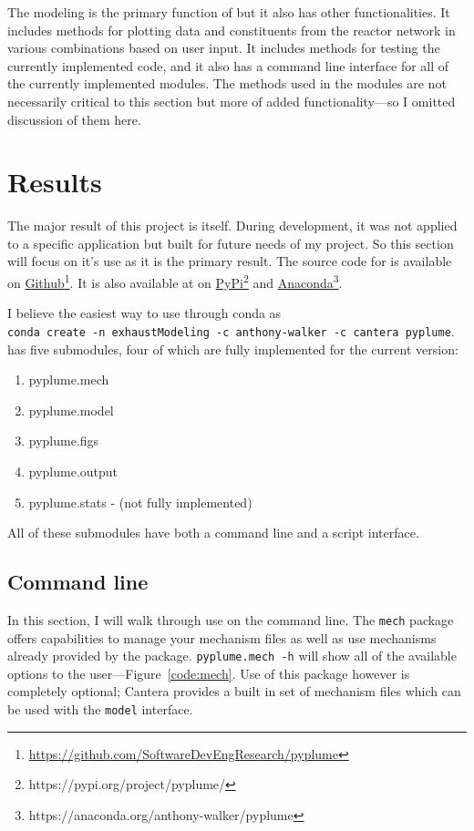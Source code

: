 \documentclass[smallextended,referee]{svjour3}
\begin{document}
The modeling is the primary function of \pyplume{} but it also has other functionalities. It includes methods for plotting data and constituents from the reactor network in various combinations based on user input. It includes methods for testing the currently implemented code, and it also has a command line interface for all of the currently implemented modules. The methods used in the modules are not necessarily critical to this section but more of added functionality---so I omitted discussion of them here.




\section{Results}
The major result of this project is \pyplume{} itself. During development, it was not applied to a specific application but built for future needs of my project. So this section will focus on it's use as it is the primary result. The source code for \pyplume{} is available on \href{https://github.com/SoftwareDevEngResearch/pyplume}{Github}\footnote{\url{https://github.com/SoftwareDevEngResearch/pyplume}}. It is also available at on \href{https://pypi.org/project/pyplume/}{PyPi}\footnote{https://pypi.org/project/pyplume/} and \href{https://anaconda.org/anthony-walker/pyplume}{Anaconda}\footnote{https://anaconda.org/anthony-walker/pyplume}.

I believe the easiest way to use \pyplume{} through conda as
\\
\noindent
\texttt{conda create -n exhaustModeling -c anthony-walker -c cantera pyplume}.
\pyplume{} has five submodules, four of which are fully implemented for the current version:
\begin{enumerate}[noitemsep,topsep=0pt]
    \item pyplume.mech
    \item pyplume.model
    \item pyplume.figs
    \item pyplume.output
    \item pyplume.stats - (not fully implemented)
\end{enumerate}
\noindent
All of these submodules have both a command line and a script interface.

\subsection{\textbf{Command line}}

In this section, I will walk through use on the command line. The \texttt{mech} package offers capabilities to manage your mechanism files as well as use mechanisms already provided by the package. \texttt{pyplume.mech -h} will show all of the available options to the user---Figure~\ref{code:mech}. Use of this package however is completely optional; Cantera provides a built in set of mechanism files which can be used with the \texttt{model} interface.
\end{document}
